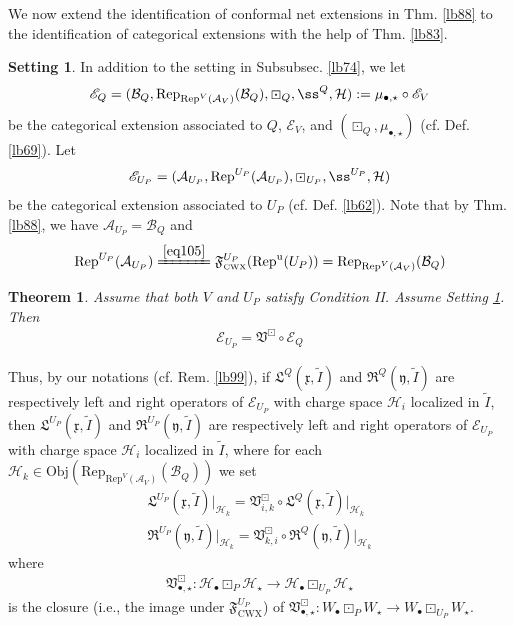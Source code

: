 \documentclass[11pt,b5paper,notitlepage]{article}
\theoremstyle{definition}
\newtheorem{sett}[df]{Setting}
\theoremstyle{plain}
\newtheorem{thm}[df]{Theorem}
\newcommand{\fk}{\mathfrak}
\newcommand{\mc}{\mathcal}
\newcommand{\wtd}{\widetilde}
\newcommand{\Rep}{\mathrm{Rep}}
\newcommand{\scr}{\mathscr}
\newcommand{\xk}{\mathfrak x}
\newcommand{\yk}{\mathfrak y}
\newcommand{\blt}{\bullet}
\newcommand{\Obj}{\mathrm{Obj}}
\newcommand{\CWX}{{\scriptscriptstyle \mathrm{CWX}}}
\newcommand{\RepUP}{\mathrm{Rep}^{\mathrm u}(U_P)}
\numberwithin{equation}{section}
\begin{document}
We now extend the identification of conformal net extensions in Thm. \ref{lb88} to the identification of categorical extensions with the help of Thm. \ref{lb83}.


\begin{sett}\label{lb89}
In addition to the setting in Subsubsec. \ref{lb74}, we let
\begin{align}\label{eq71}
\scr E_Q=(\mc B_Q,\Rep_{\Rep^V(\mc A_V)}(\mc B_Q),\boxdot_Q,\ss^Q,\mc H):=\mu_{\blt,\star}\circ\scr E_V
\end{align}
be the categorical extension associated to $Q$, $\scr E_V$, and $(\boxdot_Q,\mu_{\blt,\star})$ (cf. Def. \ref{lb69}). Let
\begin{align}
\scr E_{U_P}=(\mc A_{U_P},\Rep^{U_P}(\mc A_{U_P}),\boxdot_{U_P},\ss^{U_P},\mc H)
\end{align}
be the categorical extension associated to $U_P$ (cf. Def. \ref{lb62}). Note that by Thm. \ref{lb88}, we have $\mc A_{U_P}=\mc B_Q$ and 
\begin{align}
\Rep^{U_P}(\mc A_{U_P})\xlongequal{\eqref{eq105}}\fk F^{U_P}_\CWX(\RepUP)=\Rep_{\Rep^V(\mc A_V)}(\mc B_Q)
\end{align}
\end{sett}



\begin{thm}\label{lb92}
Assume that both $V$ and $U_P$ satisfy Condition II. Assume Setting \ref{lb89}. Then
\begin{align}
\scr E_{U_P}=\fk V^\boxdot\circ\scr E_Q
\end{align}
\end{thm}

Thus, by our notations (cf. Rem. \ref{lb99}), if $\fk L^Q(\xk,\wtd I)$ and $\fk R^Q(\yk,\wtd I)$ are respectively left and right operators of $\scr E_{U_P}$ with charge space $\mc H_i$ localized in $\wtd I$, then $\fk L^{U_P}(\xk,\wtd I)$ and $\fk R^{U_P}(\yk,\wtd I)$ are respectively left and right operators of $\scr E_{U_P}$ with charge space $\mc H_i$ localized in $\wtd I$, where for each $\mc H_k\in\Obj(\Rep_{\Rep^V(\mc A_V)}(\mc B_Q))$ we set
\begin{subequations}
\begin{gather}
\fk L^{U_P}(\xk,\wtd I)\big|_{\mc H_k}=\fk V^{\boxdot}_{i,k}\circ\fk L^Q(\xk,\wtd I)\big|_{\mc H_k}\\
 \fk R^{U_P}(\yk,\wtd I)\big|_{\mc H_k}=\fk V^{\boxdot}_{k,i}\circ\fk R^Q(\yk,\wtd I)\big|_{\mc H_k}
\end{gather}
\end{subequations}
where
\begin{gather}
\fk V^\boxdot_{\blt,\star}:\mc H_\blt\boxdot_P\mc H_\star\rightarrow\mc H_\blt\boxdot_{U_P}\mc H_\star
\end{gather}
is the closure (i.e., the image under $\fk F^{U_P}_\CWX$) of $\fk V^\boxdot_{\blt,\star}:W_\blt\boxdot_PW_\star\rightarrow W_\blt\boxdot_{U_P}W_\star$.
\end{document}
